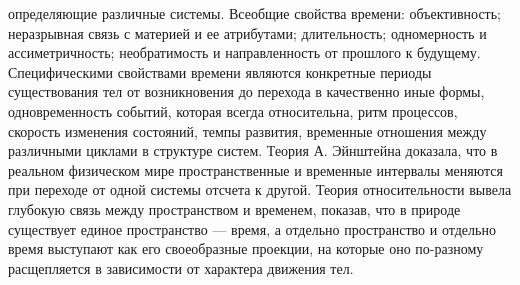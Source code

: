 \documentclass[12pt]{article}
\begin{document}
определяющие различные системы.
Всеобщие свойства времени: объективность; неразрывная связь с материей и ее атрибутами; длительность;
одномерность и ассиметричность; необратимость и направленность от прошлого к будущему.
Специфическими свойствами времени являются конкретные периоды существования тел от возникновения до
перехода в качественно иные формы, одновременность событий, которая всегда относительна, ритм процессов,
скорость изменения состояний, темпы развития, временные отношения между различными циклами в структуре
систем.
Теория А. Эйнштейна доказала, что в реальном физическом мире пространственные и временные интервалы
меняются при переходе от одной системы отсчета к другой.
Теория относительности вывела глубокую связь между пространством и временем, показав, что в природе
существует единое  пространство —  время,  а  отдельно  пространство и отдельно  время выступают  как  его
своеобразные проекции, на которые оно по-разному расщепляется в зависимости от характера движения тел. 

\newpage
\end{document}
